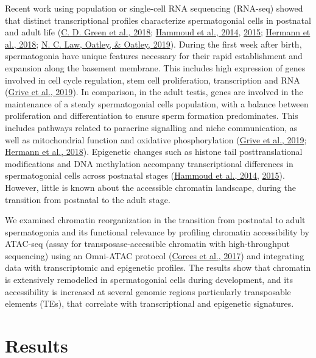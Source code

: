 \documentclass[12pt,twoside]{reedthesis}
\begin{document}
Recent work using population or single-cell RNA sequencing (RNA-seq)
showed that distinct transcriptional profiles characterize
spermatogonial cells in postnatal and adult life (\protect\hyperlink{ref-green2018}{C. D. Green et al., 2018}; \protect\hyperlink{ref-hammoud2014}{Hammoud et al., 2014}, \protect\hyperlink{ref-hammoud2015}{2015}; \protect\hyperlink{ref-hermann2018}{Hermann et al., 2018}; \protect\hyperlink{ref-law2019}{N. C. Law, Oatley, \& Oatley, 2019}). During the first week
after birth, spermatogonia have unique features necessary for their
rapid establishment and expansion along the basement membrane. This
includes high expression of genes involved in cell cycle regulation,
stem cell proliferation, transcription and RNA (\protect\hyperlink{ref-grive2019}{Grive et al., 2019}). In
comparison, in the adult testis, genes are involved in the maintenance
of a steady spermatogonial cells population, with a balance between
proliferation and differentiation to ensure sperm formation
predominates. This includes pathways related to paracrine signalling and
niche communication, as well as mitochondrial function and oxidative
phosphorylation (\protect\hyperlink{ref-grive2019}{Grive et al., 2019}; \protect\hyperlink{ref-hermann2018}{Hermann et al., 2018}). Epigenetic changes such as
histone tail posttranslational modifications and DNA methylation
accompany transcriptional differences in spermatogonial cells across
postnatal stages (\protect\hyperlink{ref-hammoud2014}{Hammoud et al., 2014}, \protect\hyperlink{ref-hammoud2015}{2015}). However, little is known
about the accessible chromatin landscape, during the transition from
postnatal to the adult stage.

We examined chromatin reorganization in the transition from postnatal to
adult spermatogonia and its functional relevance by profiling chromatin
accessibility by ATAC-seq (assay for transposase-accessible chromatin
with high-throughput sequencing) using an Omni-ATAC protocol
(\protect\hyperlink{ref-corces2017}{Corces et al., 2017}) and integrating data with transcriptomic and epigenetic
profiles. The results show that chromatin is extensively remodelled in
spermatogonial cells during development, and its accessibility is
increased at several genomic regions particularly transposable elements
(TEs), that correlate with transcriptional and epigenetic signatures.

\newpage

\hypertarget{results}{%
\section{Results}\label{results}}
\end{document}
